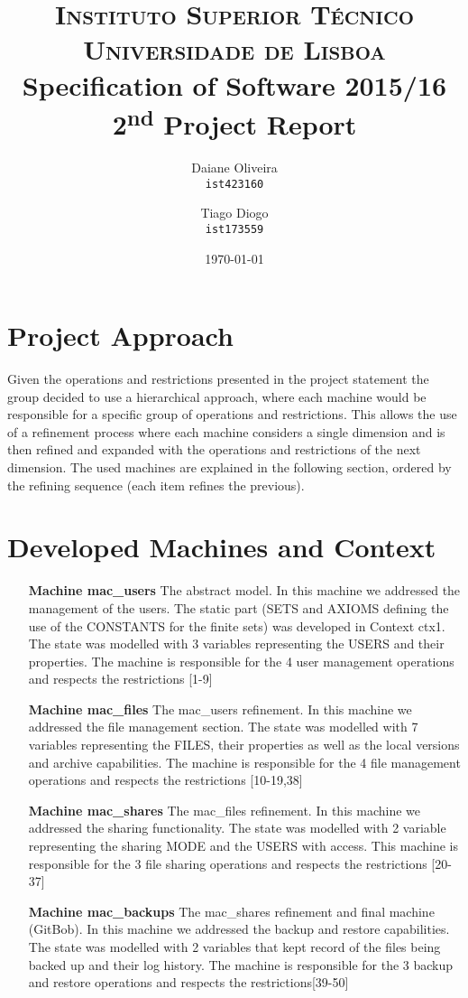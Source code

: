 \documentclass[paper=a4, fontsize=11pt]{scrartcl} %
\title{\vspace{-1.5cm}
\normalfont \normalsize 
\textsc{Instituto Superior Técnico\\Universidade de Lisboa} \\ [12pt] %
\huge Specification of Software 2015/16\\2\textsuperscript{nd} Project Report \\ [5pt]
}
\author{
  Daiane Oliveira\\
  \texttt{ist423160}
  \and
  Tiago Diogo\\
  \texttt{ist173559}
}
\date{\normalsize\today} %
\numberwithin{equation}{section} %
\numberwithin{figure}{section} %
\numberwithin{table}{section} %
\begin{document}
\maketitle %

\section{Project Approach}
Given the operations and restrictions presented in the project statement the group decided to use a hierarchical approach, where each machine would be responsible for a specific group of operations and restrictions. This allows the use of a refinement process where each machine considers a single dimension and is then refined and expanded with the operations and restrictions of the next dimension. The used machines are explained in the following section, ordered by the refining sequence (each item refines the previous).

\section{Developed Machines and Context}
\begin{itemize}
	\item[\textbf{Machine mac\_users}]The abstract model. In this machine we addressed the management of the users. The static part (SETS and AXIOMS defining the use of the CONSTANTS for the finite sets) was developed in Context ctx1. The state was modelled with 3 variables representing the USERS and their properties. The machine is responsible for the 4 user management operations and respects the restrictions [1-9]
	\item[\textbf{Machine mac\_files}]The mac\_users refinement. In this machine we addressed the file management section. The state was modelled with 7 variables representing the FILES, their properties as well as the local versions and archive capabilities. The machine is responsible for the 4 file management operations and respects the restrictions [10-19,38]
	\item[\textbf{Machine mac\_shares}]The mac\_files refinement. In this machine we addressed the sharing functionality. The state was modelled with 2 variable representing the sharing MODE and the USERS with access. This machine is responsible for the 3 file sharing operations and respects the restrictions [20-37]
	\item[\textbf{Machine mac\_backups}]The mac\_shares refinement and final machine (GitBob). In this machine we addressed the backup and restore capabilities. The state was modelled with 2 variables that kept record of the files being backed up and their log history. The machine is responsible for the 3 backup and restore operations and respects the restrictions[39-50]
\end{itemize}
\end{document}
